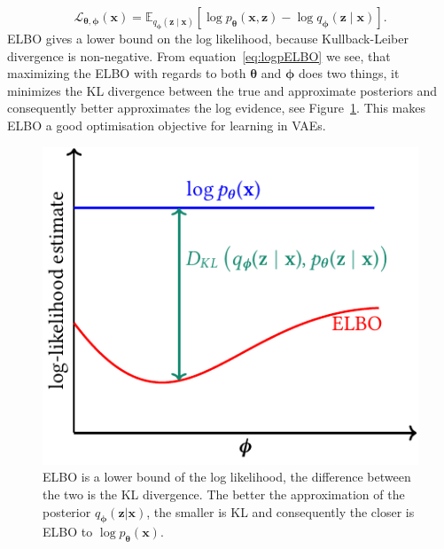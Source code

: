 \begin{equation}
	\mathcal{L}_{\boldsymbol{\theta}, \boldsymbol{\phi}}(\mathbf{x}) = \mathbb{E}_{q_{\boldsymbol{\phi}}(\mathbf{z} \mid \mathbf{x})}\left[\log p_{\boldsymbol{\theta}}(\mathbf{x}, \mathbf{z})-\log q_{\boldsymbol{\phi}}(\mathbf{z} \mid \mathbf{x})\right]. 
\end{equation}
ELBO gives a lower bound on the log likelihood, because Kullback-Leiber divergence is non-negative. From equation~\eqref{eq:logpELBO} we see, that maximizing the ELBO with regards to both $\boldsymbol{\theta}$ and $\boldsymbol{\phi}$ does two things, it minimizes the KL divergence between the true and approximate posteriors and consequently better approximates the log evidence, see Figure~\ref{fig:elbodiagram}. This makes ELBO a good optimisation objective for learning in VAEs. 
\begin{figure}
	\centering
	\includegraphics[width=0.5\linewidth]{Chapter2/Figs/Vector/elbo_diagram.pdf}
	\caption{ELBO is a lower bound of the log likelihood, the difference between the two is the KL divergence. The better the approximation of the posterior $q_{\boldsymbol{\phi}}(\mathbf{z}|\mathbf{x})$, the smaller is KL and consequently the closer is ELBO to $\log p_{\boldsymbol{\theta}}(\mathbf{x})$.}
	\label{fig:elbodiagram}
\end{figure}

